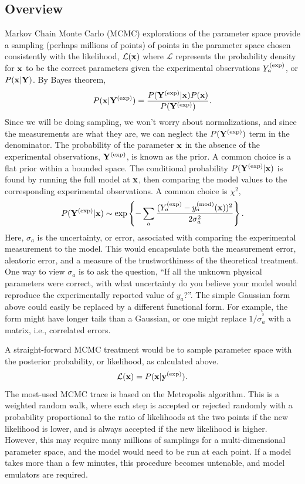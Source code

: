 \subsection{Overview}

Markov Chain Monte Carlo (MCMC) explorations of the parameter space provide a sampling (perhaps millions of points) of points in the parameter space chosen consistently with the likelihood, ${\mathcal L}({\bf x})$ where ${\mathcal L}$ represents the probability density for ${\bf x}$ to be the correct parameters given the experimental observations $Y^{\rm(exp)}_a$, or $P({\bf x}|{\bf Y})$. By Bayes theorem,
\begin{equation}
P({\bf x}|{\bf Y}^{\rm(exp)}) = \frac{P({\bf Y}^{\rm(exp)}|{\bf x}) P({\bf x})}{P({\bf Y}^{\rm(exp)})}.
\end{equation}
Since we will be doing sampling, we won't worry about normalizations, and since the measurements are what they are, we can neglect the $P({\bf Y}^{\rm(exp)})$ term in the denominator. The probability of the parameter ${\bf x}$ in the absence of the experimental observations, ${\bf Y}^{\rm(exp)}$, is known as the prior. A common choice is a flat prior within a bounded space. The conditional probability $P({\bf Y}^{\rm(exp)}|{\bf x})$ is found by running the full model at ${\bf x}$, then comparing the model values to the corresponding experimental observations. A common choice is $\chi^2$,
\begin{equation}
P({\bf Y}^{\rm(exp)}|{\bf x})\sim \exp\left\{-
\sum_a\frac{(Y^{\rm(exp)}_a-y_a^{\rm(mod)}({\bf x}))^2}{2\sigma_a^2}\right\}.
\end{equation}
Here, $\sigma_a$ is the uncertainty, or error, associated with comparing the experimental measurement to the model. This would encapsulate both the measurement error, aleatoric error, and a measure of the trustworthiness of the theoretical treatment. One way to view $\sigma_a$ is to ask the question, ``If all the unknown physical parameters were correct, with what uncertainty do you believe your model would reproduce the experimentally reported value of $y_a$?''. The simple Gaussian form above could easily be replaced by a different functional form. For example, the form might have longer tails than a Gaussian, or one might replace $1/\sigma_a^^2$ with a matrix, i.e., correlated errors.

A straight-forward MCMC treatment would be to sample parameter space with the posterior probability, or likelihood, as calculated above.
\[
{\mathcal L}({\bf x})=P({\bf x}|{\bf y^{\rm(exp)}}).
\]
The most-used MCMC trace is based on the Metropolis algorithm. This is a weighted random walk, where each step is accepted or rejected randomly with a probability proportional to the ratio of likelihoods at the two points if the new likelihood is lower, and is always accepted if the new likelihood is higher. However, this may require many millions of samplings for a multi-dimensional parameter space, and the model would need to be run at each point. If a model takes more than a few minutes, this procedure becomes untenable, and model emulators are required.

